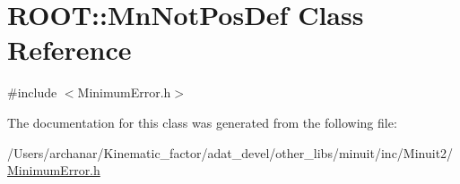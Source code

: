 \hypertarget{classROOT_1_1Minuit2_1_1MinimumError_1_1MnNotPosDef}{}\section{R\+O\+OT\+:\+:Mn\+Not\+Pos\+Def Class Reference}
\label{classROOT_1_1Minuit2_1_1MinimumError_1_1MnNotPosDef}


{\ttfamily \#include $<$Minimum\+Error.\+h$>$}



The documentation for this class was generated from the following file\+:\begin{DoxyCompactItemize}
\item 
/\+Users/archanar/\+Kinematic\+\_\+factor/adat\+\_\+devel/other\+\_\+libs/minuit/inc/\+Minuit2/\mbox{\hyperlink{other__libs_2minuit_2inc_2Minuit2_2MinimumError_8h}{Minimum\+Error.\+h}}\end{DoxyCompactItemize}
